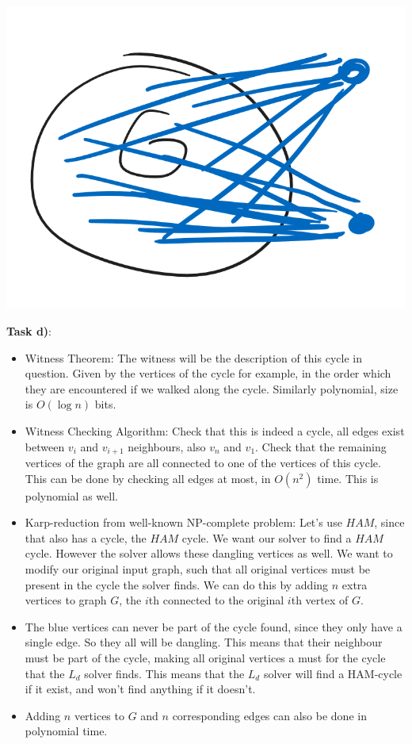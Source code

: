 \begin{center}
    \includegraphics[width=\linewidth]{09/01/maxindep_karp.png}
\end{center}

\textbf{Task d)}:
\begin{itemize}
    \item Witness Theorem: The witness will be the description of this cycle in question. Given by the vertices of the cycle for example, in the order which they are encountered if we walked along the cycle. Similarly polynomial, size is $O(\log{}n)$ bits.
    \item Witness Checking Algorithm: Check that this is indeed a cycle, all edges exist between $v_i$ and $v_{i+1}$ neighbours, also $v_n$ and $v_1$. Check that the remaining vertices of the graph are all connected to one of the vertices of this cycle. This can be done by checking all edges at most, in $O(n^2)$ time. This is polynomial as well.
    \item Karp-reduction from well-known NP-complete problem: Let's use $HAM$, since that also has a cycle, the $HAM$ cycle. We want our solver to find a $HAM$ cycle. However the solver allows these dangling vertices as well. We want to modify our original input graph, such that all original vertices must be present in the cycle the solver finds. We can do this by adding $n$ extra vertices to graph $G$, the $i$th connected to the original $i$th vertex of $G$.
    \item The blue vertices can never be part of the cycle found, since they only have a single edge. So they all will be dangling. This means that their neighbour must be part of the cycle, making all original vertices a must for the cycle that the $L_d$ solver finds. This means that the $L_d$ solver will find a HAM-cycle if it exist, and won't find anything if it doesn't.
    \item Adding $n$ vertices to $G$ and $n$ corresponding edges can also be done in polynomial time.
\end{itemize}

